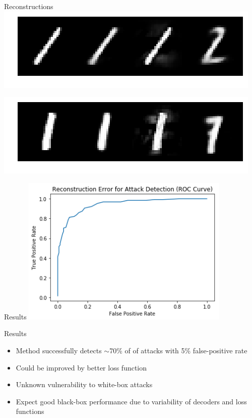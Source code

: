 \documentclass{beamer}
\begin{document}
	\begin{frame}{Reconstructions}
		\centering
		\includegraphics[width=\textwidth]{recon-fig4}		
		
		\includegraphics[width=\textwidth]{recon-fig3}
	\end{frame}
	
	\begin{frame}{Results}
		\centering
		\includegraphics[width=10cm]{mse_roc}
	\end{frame}
	
	\begin{frame}{Results}
		\begin{itemize}
			\item Method successfully detects $\sim$70\% of of attacks with 5\% false-positive rate
			\item Could be improved by better loss function
			\item Unknown vulnerability to white-box attacks
			\item Expect good black-box performance due to variability of decoders and loss functions
		\end{itemize}
	\end{frame}
	
\end{document}

